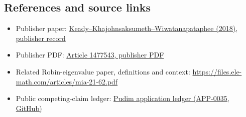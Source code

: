 \documentclass[11pt,a4paper]{article}
\begin{document}
\subsection*{References and source links}
\begin{itemize}
\item Publisher paper:
\href{https://www.tandfonline.com/doi/full/10.1080/25742558.2018.1477543}{Keady--Khajohnsaksumeth--Wiwatanapataphee (2018), publisher record}
\item Publisher PDF:
\href{https://www.tandfonline.com/doi/pdf/10.1080/25742558.2018.1477543}{Article 1477543, publisher PDF}
\item Related Robin-eigenvalue paper, definitions and context:
\url{https://files.ele-math.com/articles/mia-21-62.pdf}
\item Public competing-claim ledger:
\href{https://github.com/pudim-project/pudim-ai-demo-zetalaw/blob/main/APPLICATIONS.md}{Pudim application ledger (APP-0035, GitHub)}
\end{itemize}
\end{document}
